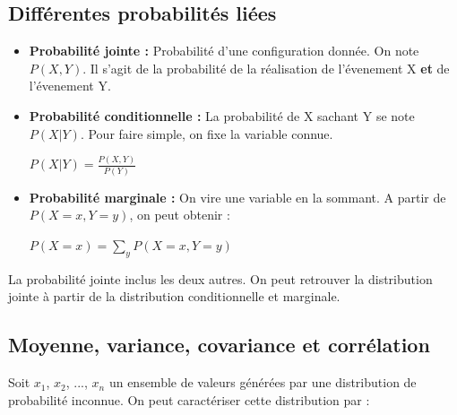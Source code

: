 \documentclass{article}
\begin{document}
\subsection{Différentes probabilités liées}

\begin{itemize}

\item \textbf{Probabilité jointe :} Probabilité d'une configuration donnée. On note $P(X, Y)$. Il s'agit de la probabilité de la réalisation de l'évenement X \textbf{et} de l'évenement Y.

\item \textbf{Probabilité conditionnelle :} La probabilité de X sachant Y se note $P(X|Y)$. Pour faire simple, on fixe la variable connue.

$ P(X|Y) = \frac{P(X, Y)}{P(Y)} $
 
\item \textbf{Probabilité marginale :} On vire une variable en la sommant. A partir de $P(X = x, Y = y)$, on peut obtenir :

$ P(X = x) = \sum_{y} P(X = x, Y = y) $

\end{itemize}

La probabilité jointe inclus les deux autres. On peut retrouver la distribution jointe à partir de la distribution conditionnelle et
marginale.


\subsection{Moyenne, variance, covariance et corrélation}

Soit $x_1$, $x_2$, ..., $x_n$ un ensemble de valeurs générées par une distribution de probabilité inconnue. On peut caractériser cette distribution par : 
\end{document}
